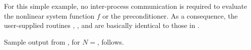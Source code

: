 For this simple example, no inter-process communication is required to
evaluate the nonlinear system function $f$ or the preconditioner. 
As a consequence, the user-supplied routines , , and
 are basically identical to those in .

Sample output from , for $N=$, follows.


